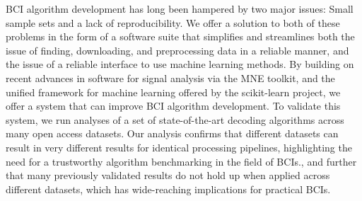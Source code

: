 BCI algorithm development has long been hampered by two major issues:
Small sample sets and a lack of reproducibility. We offer a solution
to both of these problems in the form of a software suite that
simplifies and streamlines both the issue of finding, downloading, and
preprocessing data in a reliable manner, and the issue of a reliable
interface to use machine learning methods. By building on recent
advances in software for signal analysis via the MNE toolkit, and the
unified framework for machine learning offered by the
scikit-learn project, we offer a system that can improve BCI
algorithm development. To validate this system, we run analyses of a
set of state-of-the-art decoding algorithms across many open access
datasets. Our analysis confirms that different datasets can result in
very different results for identical processing pipelines,
highlighting the need for a trustworthy algorithm benchmarking in the
field of BCIs., and further that many previously validated results do
not hold up when applied across different datasets, which has
wide-reaching implications for practical BCIs.

